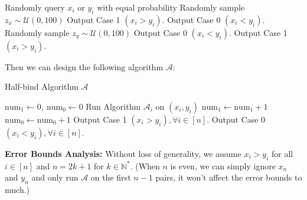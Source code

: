 \begin{answer}
\begin{enumerate}[label=\alph*).]
\begin{algo}
\begin{algorithmic}[1]
            \State Randomly query $x_i$ or $y_i$ with equal probability
                \State Randomly sample $z_x \sim \mathcal{U}(0,100)$    
                    \State Output Case 1 $(x_i > y_i)$.
                \Else
                    \State Output Case 0 $(x_i < y_i)$.
                \EndIf
            \Else
                \State Randomly sample $z_y \sim \mathcal{U}(0,100)$
                    \State Output Case 0 $(x_i < y_i)$.
                \Else
                    \State Output Case 1 $(x_i > y_i)$.
                \EndIf
            \EndIf
        \end{algorithmic}
    \end{algo}
    Then we can design the following algorithm $\mathcal{A}$:
    \begin{algo}
        \caption{Half-bind Algorithm $\mathcal{A}$}
        \label{alg:half-blind}
        \begin{algorithmic}[1]
            \State $\text{num}_1 \gets 0, ~ \text{num}_0 \gets 0$ 
                \State Run Algorithm $\mathcal{A}_i$ on $(x_i, y_i)$
                    \State $\text{num}_1 \gets \text{num}_1 + 1$
                \Else   
                    \State $\text{num}_0 \gets \text{num}_0 + 1$
                \EndIf
            \EndFor
                \State Output Case 1 $(x_i > y_i), \forall i\in [n]$.
            \Else
                \State Output Case 0 $(x_i < y_i), \forall i\in [n]$.
            \EndIf
        \end{algorithmic}
    \end{algo}
    \textbf{Error Bounds Analysis:} Without loss of generality, we assume $x_i > y_i$ for all $i \in [n]$ and $n = 2k + 1$ for $k \in \mathbb{N}^*$.
    (When $n$ is even, we can simply ignore $x_{n}$ and $y_{n}$ and only run $\mathcal{A}$ on the first $n-1$ pairs, it won't affect the error bounds to much.)
    

\end{enumerate}
\end{answer}
